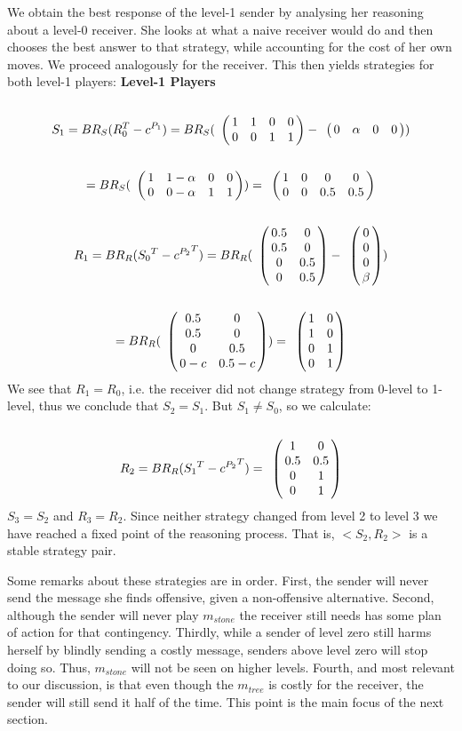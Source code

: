 \documentclass[10pt]{article}
\begin{document}
We obtain the best response of the level-1 sender by analysing her reasoning about a level-0 receiver. She looks at what a naive receiver would do and then chooses the best answer to that strategy, while accounting for the cost of her own moves. We proceed analogously for the receiver. This then yields strategies for both level-1 players:
\textbf{Level-1 Players}\\
\begin{equation*}
S_1= BR_S(R^T_0-c^{P_1})=
BR_S(
\bordermatrix{
            & & & &    \cr
 &       1 &         1 & 0       & 0 \cr
 &       0 &         0 & 1      & 1
 }
-
\bordermatrix{
            & & & &    \cr
 &       0 &         \alpha & 0       & 0 \cr
 }
)
\end{equation*}
\begin{equation*}
=BR_S(
\bordermatrix{
                & & & &    \cr
     &       1 &         1-\alpha & 0       & 0 \cr
     &       0 &         0-\alpha & 1      & 1
 }
 )
=
\bordermatrix{
                 & & & &    \cr
      &       1 &         0 & 0       & 0 \cr
      &       0 &         0 & 0.5      & 0.5
  }
\end{equation*}
\begin{equation*}
R_1=BR_R({S_0}^T-{c^{P_2}}^T)=
BR_R(
\bordermatrix{
            &  & \cr
    & 0.5 & 0 \cr
     & 0.5 & 0 \cr
     & 0 & 0.5 \cr
     & 0 & 0.5 \cr
 }
-
\bordermatrix{
  & \cr
    & 0 \cr
     & 0 \cr
     & 0 \cr
     & \beta \cr
 }
)
\end{equation*}
\begin{equation*}
=
BR_R(
\bordermatrix{
            &  & \cr
    & 0.5 & 0 \cr
     & 0.5 & 0 \cr
     & 0 & 0.5 \cr
     & 0-c & 0.5-c \cr
 }
 )
=
\bordermatrix{
            &  & \cr
    & 1 & 0 \cr
     & 1 & 0 \cr
     & 0 & 1 \cr
     & 0 & 1 \cr
 }
\end{equation*}
We see that $R_1=R_0$, i.e. the receiver did not change strategy from 0-level to 1-level, thus we conclude that $S_2=S_1$. But $S_1 \neq S_0$, so we calculate:
\begin{equation*}
R_2=BR_R({S_1}^T-{c^{P_2}}^T)=
\bordermatrix{
            &  & \cr
    & 1 & 0 \cr
     & 0.5 & 0.5 \cr
     & 0 & 1 \cr
     & 0 & 1 \cr
 }
\end{equation*}
$S_3=S_2$ and $R_3=R_2$. Since neither strategy changed from level 2 to level 3 we have reached a fixed point of the reasoning process. That is,  $<S_2,R_2>$ is a stable strategy pair.

Some remarks about these strategies are in order. First, the sender will never send the message she finds offensive, given a non-offensive alternative. Second, although the sender will never play $m_{stone}$ the receiver still needs has some plan of action for that contingency. Thirdly, while a sender of level zero still harms herself by blindly sending a costly message, senders above level zero will stop doing so. Thus, $m_{stone}$ will not be seen on higher levels. Fourth, and most relevant to our discussion, is that even though the $m_{tree}$ is costly for the receiver, the sender will still send it half of the time. This point is the main focus of the next section.
\end{document}
